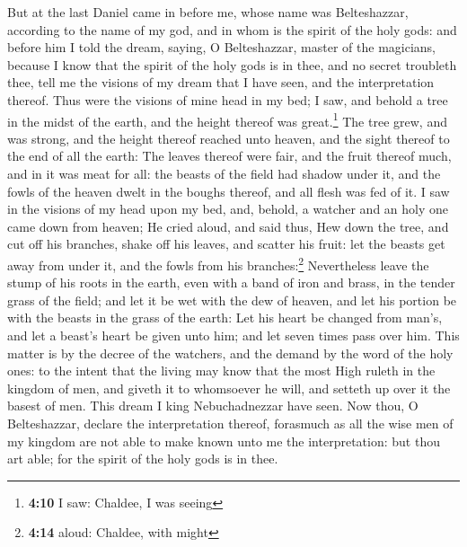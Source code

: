  But at the last Daniel came in before me, whose name was
Belteshazzar, according to the name of my god, and in whom is the spirit
of the holy gods: and before him I told the dream, saying,
 O Belteshazzar, master of the magicians, because I know
that the spirit of the holy gods is in thee, and no secret troubleth
thee, tell me the visions of my dream that I have seen, and the
interpretation thereof.  Thus were the visions of mine
head in my bed; I saw, and behold a tree in the midst of the earth, and
the height thereof was great.\footnote{\textbf{4:10} I saw: Chaldee, I
  was seeing}  The tree grew, and was strong, and the
height thereof reached unto heaven, and the sight thereof to the end of
all the earth:  The leaves thereof were fair, and the
fruit thereof much, and in it was meat for all: the beasts of the field
had shadow under it, and the fowls of the heaven dwelt in the boughs
thereof, and all flesh was fed of it.  I saw in the
visions of my head upon my bed, and, behold, a watcher and an holy one
came down from heaven;  He cried aloud, and said thus,
Hew down the tree, and cut off his branches, shake off his leaves, and
scatter his fruit: let the beasts get away from under it, and the fowls
from his branches:\footnote{\textbf{4:14} aloud: Chaldee, with might}
 Nevertheless leave the stump of his roots in the earth,
even with a band of iron and brass, in the tender grass of the field;
and let it be wet with the dew of heaven, and let his portion be with
the beasts in the grass of the earth:  Let his heart be
changed from man's, and let a beast's heart be given unto him; and let
seven times pass over him.  This matter is by the decree
of the watchers, and the demand by the word of the holy ones: to the
intent that the living may know that the most High ruleth in the kingdom
of men, and giveth it to whomsoever he will, and setteth up over it the
basest of men.  This dream I king Nebuchadnezzar have
seen. Now thou, O Belteshazzar, declare the interpretation thereof,
forasmuch as all the wise men of my kingdom are not able to make known
unto me the interpretation: but thou art able; for the spirit of the
holy gods is in thee.

